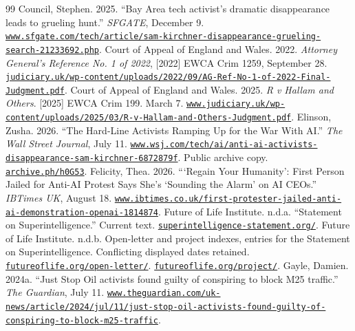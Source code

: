 \documentclass[11pt]{article}
\begin{document}
\begin{thebibliography}{99}
 Council, Stephen. 2025. ``Bay Area tech activist's dramatic disappearance leads to grueling hunt.'' \emph{SFGATE}, December 9. \href{https://www.sfgate.com/tech/article/sam-kirchner-disappearance-grueling-search-21233692.php}{\nolinkurl{www.sfgate.com/tech/article/sam-kirchner-disappearance-grueling-search-21233692.php}}.
 Court of Appeal of England and Wales. 2022. \emph{Attorney General's Reference No. 1 of 2022}, [2022] EWCA Crim 1259, September 28. \href{https://www.judiciary.uk/wp-content/uploads/2022/09/AG-Ref-No-1-of-2022-Final-Judgment.pdf}{\nolinkurl{judiciary.uk/wp-content/uploads/2022/09/AG-Ref-No-1-of-2022-Final-Judgment.pdf}}.
 Court of Appeal of England and Wales. 2025. \emph{R v Hallam and Others}. [2025] EWCA Crim 199. March 7. \href{https://www.judiciary.uk/wp-content/uploads/2025/03/R-v-Hallam-and-Others-Judgment.pdf}{\nolinkurl{www.judiciary.uk/wp-content/uploads/2025/03/R-v-Hallam-and-Others-Judgment.pdf}}.
 Elinson, Zusha. 2026. ``The Hard-Line Activists Ramping Up for the War With AI.'' \emph{The Wall Street Journal}, July 11. \href{https://www.wsj.com/tech/ai/anti-ai-activists-disappearance-sam-kirchner-6872879f}{\nolinkurl{www.wsj.com/tech/ai/anti-ai-activists-disappearance-sam-kirchner-6872879f}}. Public archive copy. \href{https://archive.ph/h0G53}{\nolinkurl{archive.ph/h0G53}}.
 Felicity, Thea. 2026. ```Regain Your Humanity': First Person Jailed for Anti-AI Protest Says She's `Sounding the Alarm' on AI CEOs.'' \emph{IBTimes UK}, August 18. \href{https://www.ibtimes.co.uk/first-protester-jailed-anti-ai-demonstration-openai-1814874}{\nolinkurl{www.ibtimes.co.uk/first-protester-jailed-anti-ai-demonstration-openai-1814874}}.
 Future of Life Institute. n.d.a. ``Statement on Superintelligence.'' Current text. \href{https://superintelligence-statement.org/}{\nolinkurl{superintelligence-statement.org/}}.
 Future of Life Institute. n.d.b. Open-letter and project indexes, entries for the Statement on Superintelligence. Conflicting displayed dates retained. \href{https://futureoflife.org/open-letter/}{\nolinkurl{futureoflife.org/open-letter/}}. \href{https://futureoflife.org/project/}{\nolinkurl{futureoflife.org/project/}}.
 Gayle, Damien. 2024a. ``Just Stop Oil activists found guilty of conspiring to block M25 traffic.'' \emph{The Guardian}, July 11. \href{https://www.theguardian.com/uk-news/article/2024/jul/11/just-stop-oil-activists-found-guilty-of-conspiring-to-block-m25-traffic}{\nolinkurl{www.theguardian.com/uk-news/article/2024/jul/11/just-stop-oil-activists-found-guilty-of-conspiring-to-block-m25-traffic}}.

\end{thebibliography}
\end{document}
